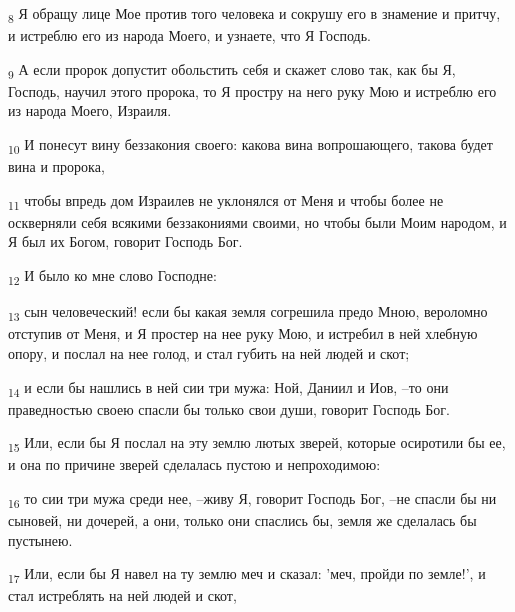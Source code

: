 \begin{tcolorbox}
\textsubscript{8} Я обращу лице Мое против того человека и сокрушу его в знамение и притчу, и истреблю его из народа Моего, и узнаете, что Я Господь.
\end{tcolorbox}
\begin{tcolorbox}
\textsubscript{9} А если пророк допустит обольстить себя и скажет слово так, как бы Я, Господь, научил этого пророка, то Я простру на него руку Мою и истреблю его из народа Моего, Израиля.
\end{tcolorbox}
\begin{tcolorbox}
\textsubscript{10} И понесут вину беззакония своего: какова вина вопрошающего, такова будет вина и пророка,
\end{tcolorbox}
\begin{tcolorbox}
\textsubscript{11} чтобы впредь дом Израилев не уклонялся от Меня и чтобы более не оскверняли себя всякими беззакониями своими, но чтобы были Моим народом, и Я был их Богом, говорит Господь Бог.
\end{tcolorbox}
\begin{tcolorbox}
\textsubscript{12} И было ко мне слово Господне:
\end{tcolorbox}
\begin{tcolorbox}
\textsubscript{13} сын человеческий! если бы какая земля согрешила предо Мною, вероломно отступив от Меня, и Я простер на нее руку Мою, и истребил в ней хлебную опору, и послал на нее голод, и стал губить на ней людей и скот;
\end{tcolorbox}
\begin{tcolorbox}
\textsubscript{14} и если бы нашлись в ней сии три мужа: Ной, Даниил и Иов, --то они праведностью своею спасли бы только свои души, говорит Господь Бог.
\end{tcolorbox}
\begin{tcolorbox}
\textsubscript{15} Или, если бы Я послал на эту землю лютых зверей, которые осиротили бы ее, и она по причине зверей сделалась пустою и непроходимою:
\end{tcolorbox}
\begin{tcolorbox}
\textsubscript{16} то сии три мужа среди нее, --живу Я, говорит Господь Бог, --не спасли бы ни сыновей, ни дочерей, а они, только они спаслись бы, земля же сделалась бы пустынею.
\end{tcolorbox}
\begin{tcolorbox}
\textsubscript{17} Или, если бы Я навел на ту землю меч и сказал: 'меч, пройди по земле!', и стал истреблять на ней людей и скот,
\end{tcolorbox}
